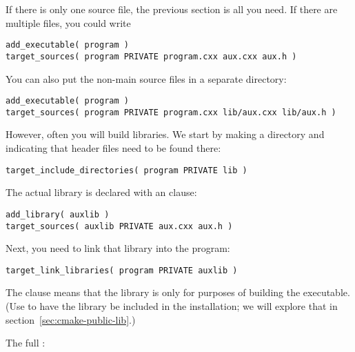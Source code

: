 \begin{floatingfigure}[r]{2.5in}
  \begin{minipage}{2.5in}
  \end{minipage}
\end{floatingfigure}
%
If there is only one source file, the previous section is all you need.
If there are multiple files, you could write
\begin{lstlisting}
add_executable( program )
target_sources( program PRIVATE program.cxx aux.cxx aux.h )
\end{lstlisting}
You can also put the non-main source files in a separate directory:
\begin{lstlisting}
add_executable( program )
target_sources( program PRIVATE program.cxx lib/aux.cxx lib/aux.h )
\end{lstlisting}

However, often you will build libraries.
We start by making a  directory and indicating that header files
need to be found there:
\begin{lstlisting}
target_include_directories( program PRIVATE lib )
\end{lstlisting}

The actual library is declared with an  clause:
\begin{lstlisting}
add_library( auxlib )
target_sources( auxlib PRIVATE aux.cxx aux.h )
\end{lstlisting}
Next, you need to link that library into the program:
\begin{lstlisting}
target_link_libraries( program PRIVATE auxlib )
\end{lstlisting}
The  clause means that the library is only for
purposes of building the executable.
(Use  to have the library be included in the installation;
we will explore that in section~\ref{sec:cmake-public-lib}.)

The full :
%


